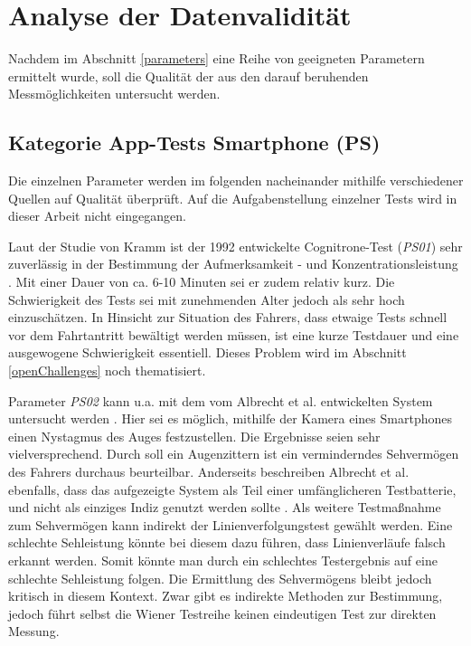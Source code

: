 \section{Analyse der Datenvalidität}
\label{dataValidity}
Nachdem im Abschnitt \ref{parameters} eine Reihe von geeigneten Parametern ermittelt wurde, soll die Qualität der aus den darauf beruhenden Messmöglichkeiten untersucht werden.

\subsection{Kategorie App-Tests Smartphone (PS)}

Die einzelnen Parameter werden im folgenden nacheinander mithilfe verschiedener Quellen auf Qualität überprüft. Auf die Aufgabenstellung einzelner Tests wird in dieser Arbeit nicht eingegangen. 

Laut der Studie von Kramm ist der 1992 entwickelte Cognitrone-Test (\textit{PS01}) sehr zuverlässig in der Bestimmung der Aufmerksamkeit - und Konzentrationsleistung \cite{studieaufmerksamkeitstests}. Mit einer Dauer von ca. 6-10 Minuten sei er zudem relativ kurz. Die Schwierigkeit des Tests sei mit zunehmenden Alter jedoch als sehr hoch einzuschätzen. In Hinsicht zur Situation des Fahrers, dass etwaige Tests schnell vor dem Fahrtantritt bewältigt werden müssen, ist eine kurze Testdauer und eine ausgewogene Schwierigkeit essentiell. Dieses Problem wird im Abschnitt \ref{openChallenges} noch thematisiert.

Parameter \textit{PS02} kann u.a. mit dem vom Albrecht et al. entwickelten System untersucht werden \cite{mobilesmarttracking}. Hier sei es möglich, mithilfe der Kamera eines Smartphones einen Nystagmus des Auges festzustellen. Die Ergebnisse seien sehr vielversprechend. Durch soll ein Augenzittern ist ein verminderndes Sehvermögen des Fahrers durchaus beurteilbar. Anderseits beschreiben Albrecht et al. ebenfalls, dass das aufgezeigte System als Teil einer umfänglicheren Testbatterie, und nicht als einziges Indiz genutzt werden sollte \cite{mobilesmarttracking}. Als weitere Testmaßnahme zum Sehvermögen kann indirekt der Linienverfolgungstest gewählt werden. Eine schlechte Sehleistung könnte bei diesem dazu führen, dass Linienverläufe falsch erkannt werden. Somit könnte man durch ein schlechtes Testergebnis auf eine schlechte Sehleistung folgen. Die Ermittlung des Sehvermögens bleibt jedoch kritisch in diesem Kontext. Zwar gibt es indirekte Methoden zur Bestimmung, jedoch führt selbst die Wiener Testreihe keinen eindeutigen Test zur direkten Messung.

